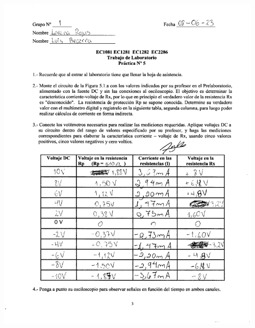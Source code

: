 \documentclass[12pt]{article}
\begin{document}
	\begin{center}
		\includegraphics[width=16cm,height=20cm]{Img/anexo_0001}
	\end{center}
	
\end{document}
